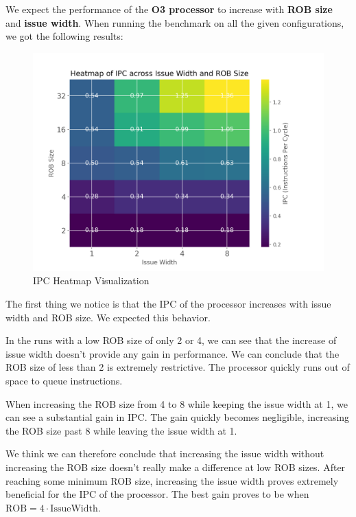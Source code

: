 \documentclass[10pt]{article}
\begin{document}
We expect the performance of the \textbf{O3 processor} to increase with \textbf{ROB size} and \textbf{issue width}. When running the benchmark on all the given configurations, we got the following results:

\begin{figure}
    \centering
    \includegraphics[width=1.0\linewidth]{images/task1/task1_1_ipc_heatmap.png}
    \caption{IPC Heatmap Visualization}
    \label{fig:heatmap}
\end{figure}

The first thing we notice is that the IPC of the processor increases with issue width and ROB size. We expected this behavior. 

In the runs with a low ROB size of only 2 or 4, we can see that the increase of issue width doesn't provide any gain in performance. We can conclude that the ROB size of less than 2 is extremely restrictive. The processor quickly runs out of space to queue instructions.

When increasing the ROB size from 4 to 8 while keeping the issue width at 1, we can see a substantial gain in IPC. The gain quickly becomes negligible, increasing the ROB size past 8 while leaving the issue width at 1.

We think we can therefore conclude that increasing the issue width without increasing the ROB size doesn't really make a difference at low ROB sizes. After reaching some minimum ROB size, increasing the issue width proves extremely beneficial for the IPC of the processor. The best gain proves to be when $\text{ROB} = 4 \cdot \text{IssueWidth}$.
\end{document}
